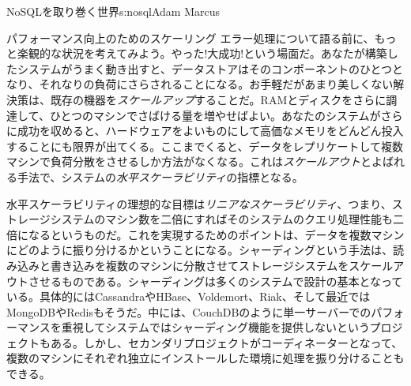 \begin{aosachapter}{NoSQLを取り巻く世界}{s:nosql}{Adam Marcus}
\begin{aosasect1}{パフォーマンス向上のためのスケーリング}
エラー処理について語る前に、もっと楽観的な状況を考えてみよう。やった!大成功!という場面だ。あなたが構築したシステムがうまく動き出すと、データストアはそのコンポーネントのひとつとなり、それなりの負荷にさらされることになる。お手軽だがあまり美しくない解決策は、既存の機器を\emph{スケールアップ}することだ。RAMとディスクをさらに調達して、ひとつのマシンでさばける量を増やせばよい。あなたのシステムがさらに成功を収めると、ハードウェアをよいものにして高価なメモリをどんどん投入することにも限界が出てくる。ここまでくると、データをレプリケートして複数マシンで負荷分散をさせるしか方法がなくなる。これは\emph{スケールアウト}とよばれる手法で、システムの\emph{水平スケーラビリティ}の指標となる。

水平スケーラビリティの理想的な目標は\emph{リニアなスケーラビリティ}、つまり、ストレージシステムのマシン数を二倍にすればそのシステムのクエリ処理性能も二倍になるというものだ。これを実現するためのポイントは、データを複数マシンにどのように振り分けるかということになる。シャーディングという手法は、読み込みと書き込みを複数のマシンに分散させてストレージシステムをスケールアウトさせるものである。シャーディングは多くのシステムで設計の基本となっている。具体的にはCassandraやHBase、Voldemort、Riak、そして最近ではMongoDBやRedisもそうだ。中には、CouchDBのように単一サーバーでのパフォーマンスを重視してシステムではシャーディング機能を提供しないというプロジェクトもある。しかし、セカンダリプロジェクトがコーディネーターとなって、複数のマシンにそれぞれ独立にインストールした環境に処理を振り分けることもできる。


\end{aosasect1}
\end{aosachapter}
